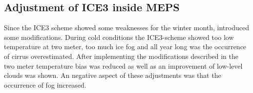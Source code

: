 \subsection{Adjustment of ICE3 inside MEPS}
Since the ICE3 scheme showed some weaknesses for the winter month, \cite{muller_arome-metcoop:_2017} introduced some modifications. 
During cold conditions the ICE3-scheme showed too low temperature at two meter, too much ice fog and all year long was the occurrence of cirrus overestimated. After implementing the modifications described in \cite{muller_arome-metcoop:_2017} the two meter temperature bias was reduced as well as an improvement of low-level clouds was shown. An negative aspect of these adjustments was that the occurrence of fog increased.%
















